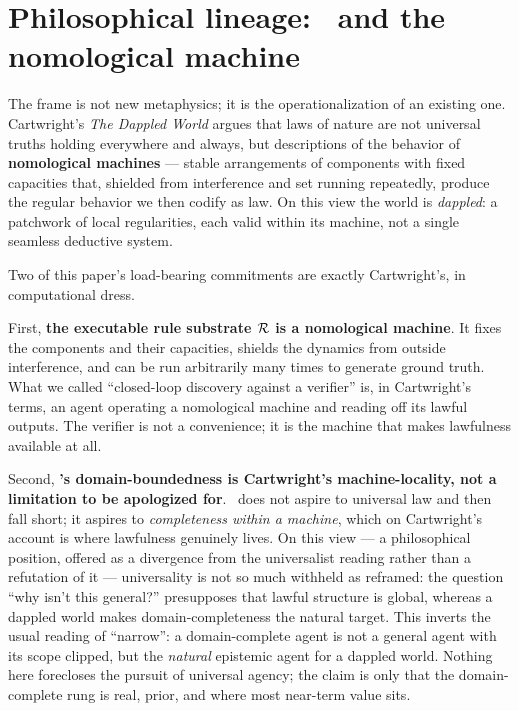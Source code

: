 \section{Philosophical lineage: \DCI\ and the nomological machine}
\label{sec:lineage}

The frame is not new metaphysics; it is the operationalization of an existing one. Cartwright's \emph{The Dappled World} \citep{cartwright1999} argues that laws of nature are not universal truths holding everywhere and always, but descriptions of the behavior of \textbf{nomological machines} --- stable arrangements of components with fixed capacities that, shielded from interference and set running repeatedly, produce the regular behavior we then codify as law. On this view the world is \emph{dappled}: a patchwork of local regularities, each valid within its machine, not a single seamless deductive system.

Two of this paper's load-bearing commitments are exactly Cartwright's, in computational dress.

First, \textbf{the executable rule substrate $\mathcal{R}$ is a nomological machine}. It fixes the components and their capacities, shields the dynamics from outside interference, and can be run arbitrarily many times to generate ground truth. What we called ``closed-loop discovery against a verifier'' is, in Cartwright's terms, an agent operating a nomological machine and reading off its lawful outputs. The verifier is not a convenience; it is the machine that makes lawfulness available at all.

Second, \textbf{\DCI's domain-boundedness is Cartwright's machine-locality, not a limitation to be apologized for}. \DCI\ does not aspire to universal law and then fall short; it aspires to \emph{completeness within a machine}, which on Cartwright's account is where lawfulness genuinely lives. On this view --- a philosophical position, offered as a divergence from the universalist reading rather than a refutation of it --- universality is not so much withheld as reframed: the question ``why isn't this general?'' presupposes that lawful structure is global, whereas a dappled world makes domain-completeness the natural target. This inverts the usual reading of ``narrow'': a domain-complete agent is not a general agent with its scope clipped, but the \emph{natural} epistemic agent for a dappled world. Nothing here forecloses the pursuit of universal agency; the claim is only that the domain-complete rung is real, prior, and where most near-term value sits.

